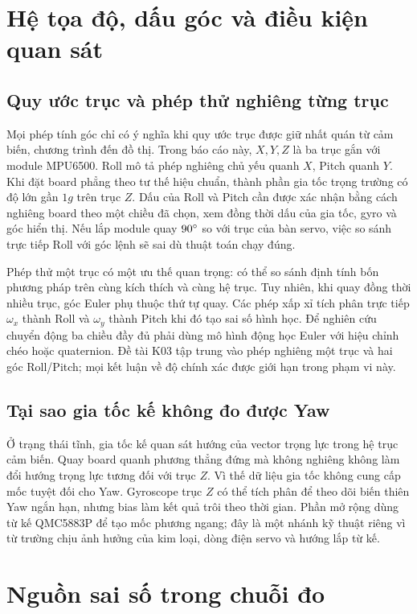 \section{Hệ tọa độ, dấu góc và điều kiện quan sát}
\subsection{Quy ước trục và phép thử nghiêng từng trục}
Mọi phép tính góc chỉ có ý nghĩa khi quy ước trục được giữ nhất quán từ cảm biến, chương trình đến đồ thị. Trong báo cáo này, $X,Y,Z$ là ba trục gắn với module MPU6500. Roll mô tả phép nghiêng chủ yếu quanh $X$, Pitch quanh $Y$. Khi đặt board phẳng theo tư thế hiệu chuẩn, thành phần gia tốc trọng trường có độ lớn gần $1g$ trên trục $Z$. Dấu của Roll và Pitch cần được xác nhận bằng cách nghiêng board theo một chiều đã chọn, xem đồng thời dấu của gia tốc, gyro và góc hiển thị. Nếu lắp module quay $90^{\circ}$ so với trục của bàn servo, việc so sánh trực tiếp Roll với góc lệnh sẽ sai dù thuật toán chạy đúng.

Phép thử một trục có một ưu thế quan trọng: có thể so sánh định tính bốn phương pháp trên cùng kích thích và cùng hệ trục. Tuy nhiên, khi quay đồng thời nhiều trục, góc Euler phụ thuộc thứ tự quay. Các phép xấp xỉ tích phân trực tiếp $\omega_x$ thành Roll và $\omega_y$ thành Pitch khi đó tạo sai số hình học. Để nghiên cứu chuyển động ba chiều đầy đủ phải dùng mô hình động học Euler với hiệu chỉnh chéo hoặc quaternion. Đề tài K03 tập trung vào phép nghiêng một trục và hai góc Roll/Pitch; mọi kết luận về độ chính xác được giới hạn trong phạm vi này.

\subsection{Tại sao gia tốc kế không đo được Yaw}
Ở trạng thái tĩnh, gia tốc kế quan sát hướng của vector trọng lực trong hệ trục cảm biến. Quay board quanh phương thẳng đứng mà không nghiêng không làm đổi hướng trọng lực tương đối với trục $Z$. Vì thế dữ liệu gia tốc không cung cấp mốc tuyệt đối cho Yaw. Gyroscope trục $Z$ có thể tích phân để theo dõi biến thiên Yaw ngắn hạn, nhưng bias làm kết quả trôi theo thời gian. Phần mở rộng dùng từ kế QMC5883P để tạo mốc phương ngang; đây là một nhánh kỹ thuật riêng vì từ trường chịu ảnh hưởng của kim loại, dòng điện servo và hướng lắp từ kế.

\section{Nguồn sai số trong chuỗi đo}
